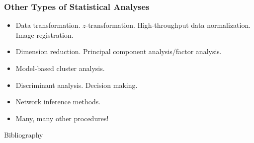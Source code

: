 \begin{frame}
  \frametitle{Other Types of Statistical  Analyses}
  \begin{itemize}
  \item Data transformation.  $z$-transformation.  High-throughput data normalization.  Image registration.
  \item Dimension reduction.  Principal component analysis/factor analysis.
  \item Model-based cluster analysis.
  \item Discriminant analysis. Decision making.
  \item Network inference methods.
  \item Many, many other procedures!
  \end{itemize}
\end{frame}

\begin{frame}[allowframebreaks]{Bibliography}
  
  
\end{frame}


